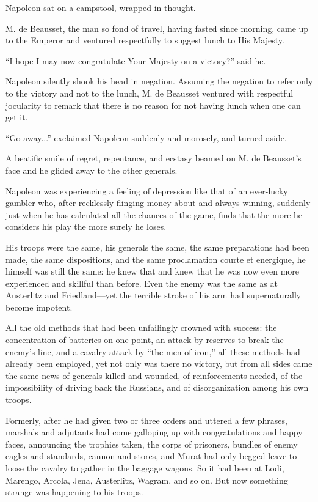 Napoleon sat on a campstool, wrapped in thought.

M. de Beausset, the man so fond of travel, having fasted since
morning, came up to the Emperor and ventured respectfully to
suggest lunch to His Majesty.

``I hope I may now congratulate Your Majesty on a victory?'' said
he.

Napoleon silently shook his head in negation. Assuming the
negation to refer only to the victory and not to the lunch, M. de
Beausset ventured with respectful jocularity to remark that there
is no reason for not having lunch when one can get it.

``Go away...'' exclaimed Napoleon suddenly and morosely, and
turned aside.

A beatific smile of regret, repentance, and ecstasy beamed on
M. de Beausset's face and he glided away to the other generals.

Napoleon was experiencing a feeling of depression like that of an
ever-lucky gambler who, after recklessly flinging money about and
always winning, suddenly just when he has calculated all the
chances of the game, finds that the more he considers his play
the more surely he loses.

His troops were the same, his generals the same, the same
preparations had been made, the same dispositions, and the same
proclamation courte et energique, he himself was still the same:
he knew that and knew that he was now even more experienced and
skillful than before. Even the enemy was the same as at
Austerlitz and Friedland---yet the terrible stroke of his arm had
supernaturally become impotent.

All the old methods that had been unfailingly crowned with
success: the concentration of batteries on one point, an attack
by reserves to break the enemy's line, and a cavalry attack by
``the men of iron,'' all these methods had already been employed,
yet not only was there no victory, but from all sides came the
same news of generals killed and wounded, of reinforcements
needed, of the impossibility of driving back the Russians, and of
disorganization among his own troops.

Formerly, after he had given two or three orders and uttered a
few phrases, marshals and adjutants had come galloping up with
congratulations and happy faces, announcing the trophies taken,
the corps of prisoners, bundles of enemy eagles and standards,
cannon and stores, and Murat had only begged leave to loose the
cavalry to gather in the baggage wagons. So it had been at Lodi,
Marengo, Arcola, Jena, Austerlitz, Wagram, and so on. But now
something strange was happening to his troops.

